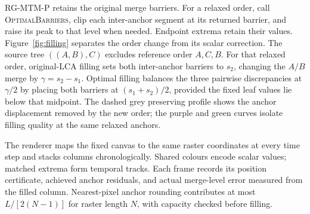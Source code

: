 RG-MTM-P retains the original merge barriers. For a relaxed order, call \textsc{OptimalBarriers}, clip each inter-anchor segment at its returned barrier, and raise its peak to that level when needed. Endpoint extrema retain their values. Figure~\ref{fig:filling} separates the order change from its scalar correction. The source tree $((A,B),C)$ excludes reference order $A,C,B$. For that relaxed order, original-LCA filling sets both inter-anchor barriers to $s_2$, changing the $A/B$ merge by $\gamma=s_2-s_1$. Optimal filling balances the three pairwise discrepancies at $\gamma/2$ by placing both barriers at $(s_1+s_2)/2$, provided the fixed leaf values lie below that midpoint. The dashed grey preserving profile shows the anchor displacement removed by the new order; the purple and green curves isolate filling quality at the same relaxed anchors.

The renderer maps the fixed canvas to the same raster coordinates at every time step and stacks columns chronologically. Shared colours encode scalar values; matched extrema form temporal tracks. Each frame records its position certificate, achieved anchor residuals, and actual merge-level error measured from the filled column. Nearest-pixel anchor rounding contributes at most $L/[2(N-1)]$ for raster length $N$, with capacity checked before filling.
